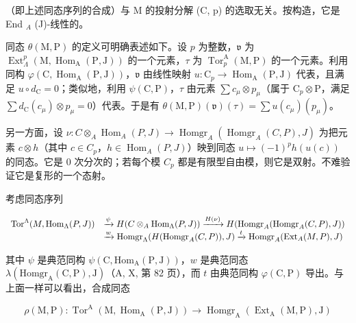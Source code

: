 （即上述同态序列的合成）与 M 的投射分解 (C, p) 的选取无关。按构造，它是 End \(_{A}\) (J)-线性的。

同态 \(\theta(\mathrm{M},\mathrm{P})\) 的定义可明确表述如下。设 \(p\) 为整数，\(\mathfrak{v}\) 为 \(\operatorname{Ext}_{\Lambda}^{p}(\mathrm{M},\operatorname{Hom}_{\mathrm{A}}(\mathrm{P},\mathrm{J}))\) 的一个元素，\(\tau\) 为 \(\operatorname{Tor}_{p}^{\mathrm{A}}(\mathrm{M},\mathrm{P})\) 的一个元素。利用同构 \(\varphi(\mathrm{C},\operatorname{Hom}_{\mathrm{A}}(\mathrm{P},\mathrm{J}))\)，\(\mathfrak{v}\) 由线性映射 \(u:\mathrm{C}_{p}\to\operatorname{Hom}_{\mathrm{A}}(\mathrm{P},\mathrm{J})\) 代表，且满足 \(u\circ d_{\mathrm{C}}=0\)；类似地，利用 \(\psi(\mathrm{C},\mathrm{P})\)，\(\tau\) 由元素 \(\sum c_{\mu}\otimes p_{\mu}\)（属于 \(\mathrm{C}_{p}\otimes\mathrm{P}\)，满足 \(\sum d_{\mathrm{C}}(c_{\mu})\otimes p_{\mu}=0\)）代表。于是有 \(\theta(\mathrm{M},\mathrm{P})(\mathfrak{v})(\tau)=\sum u(c_{\mu})(p_{\mu})\)。

另一方面，设 \(\nu : C \otimes_A \operatorname{Hom}_A(P, J) \longrightarrow \operatorname{Homgr}_A(\operatorname{Homgr}_A(C, P), J)\) 为把元素 \(c \otimes h\)（其中 \(c \in C_p\)，\(h \in \operatorname{Hom}_A(P, J)\)）映到同态 \(u \mapsto (-1)^p h(u(c))\) 的同态。它是 0 次分次的；若每个模 \(C_p\) 都是有限型自由模，则它是双射。不难验证它是复形的一个态射。

考虑同态序列

\[
\begin{array}{r l} \operatorname{Tor} ^ {\Lambda} (M, \operatorname{Hom} _ {\Lambda} (P, J)) & \xrightarrow {\psi} H (C \otimes_ {A} \operatorname{Hom} _ {\Lambda} (P, J)) \xrightarrow {H (\nu)} H (\operatorname{Homgr} _ {A} (\operatorname{Homgr} _ {A} (C, P), J)) \\ & \xrightarrow {w} \operatorname{Homgr} _ {\Lambda} (H (\operatorname{Homgr} _ {A} (C, P)), J) \xrightarrow {t} \operatorname{Homgr} _ {A} (\operatorname{Ext} _ {A} (M, P), J) \end{array}
\]

其中 \(\psi\) 是典范同构 \(\psi(\mathrm{C},\mathrm{Hom}_{\mathrm{A}}(\mathrm{P},\mathrm{J}))\)，\(w\) 是典范同态 \(\lambda(\mathrm{Homgr}_{\mathrm{A}}(\mathrm{C},\mathrm{P}),\mathrm{J})\)（A, X, 第 82 页），而 \(t\) 由典范同构 \(\varphi(\mathrm{C},\mathrm{P})\) 导出。与上面一样可以看出，合成同态

\[
\rho (\mathrm{M}, \mathrm{P}): \operatorname{Tor} ^ {\mathrm{A}} (\mathrm{M}, \operatorname{Hom} _ {\mathrm{A}} (\mathrm{P}, \mathrm{J})) \longrightarrow \operatorname{Homgr} _ {\mathrm{A}} \left(\operatorname{Ext} _ {\mathrm{A}} (\mathrm{M}, \mathrm{P}), \mathrm{J}\right)
\]

